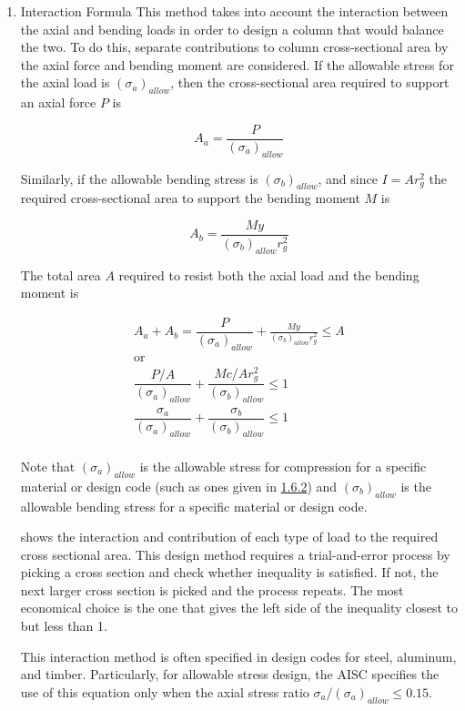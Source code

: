 \documentclass[a4paper,openany,12pt]{book}
\begin{document}
{{\begin{enumerate}
\item Interaction Formula
\label{interaction-formula}
This method takes into account the interaction between the axial and
bending loads in order to design a column that would balance the two. To
do this, separate contributions to column cross-sectional area by the
axial force and bending moment are considered. If the allowable stress
for the axial load is \((\sigma_a)_{allow}\), then the cross-sectional
area required to support an axial force \(P\) is

$$A_a = \frac{P}{(\sigma_a)_{allow}}$$

Similarly, if the allowable bending stress is \((\sigma_b)_{allow}\), and
since \(I = Ar_g^2\) the required cross-sectional area to support the
bending moment \(M\) is

$$A_b = \frac{My}{(\sigma _b)_{allow}r_g^2}$$

The total area \(A\) required to resist both the axial load and the
bending moment is

$$\label{eqn: interaction formula}
  \begin{gathered}
    A_a + A_b = \dfrac{P}{(\sigma_a)_{allow}} + \frac{My}{(\sigma _b)_{allow}r_g^2} \leqslant A \\ 
    \text{or} \\ 
    \dfrac{P/A}{(\sigma_a)_{allow}} + \dfrac{Mc/Ar_g^2}{(\sigma_b)_{allow}} \leqslant 1 \\ 
    \dfrac{\sigma _a}{(\sigma_a)_{allow}} + \dfrac{\sigma_b}{(\sigma_b)_{allow}} \leqslant 1 \\ 
  \end{gathered}$$

Note that \((\sigma_a)_{allow}\) is the allowable stress for compression
for a specific material or design code (such as ones given in
\hyperref[subsection: column concentric loading]{1.6.2}) and
\((\sigma_b)_{allow}\) is the allowable bending stress for a specific
material or design code.

shows the interaction and contribution of each type of load to the
required cross sectional area. This design method requires a
trial-and-error process by picking a cross section and check whether
inequality is satisfied. If not, the next larger cross section is picked
and the process repeats. The most economical choice is the one that
gives the left side of the inequality closest to but less than 1.

This interaction method is often specified in design codes for steel,
aluminum, and timber. Particularly, for allowable stress design, the
AISC specifies the use of this equation only when the axial stress ratio
\(\sigma_a / (\sigma_a)_{allow} \leq 0.15\).


\end{enumerate}}}
\end{document}

